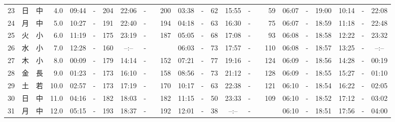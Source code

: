\documentclass[12pt,a4j]{jsarticle}
\begin{document}
\begin{table}[htbp]
\begin{center}
{\begin{tabular}{|rc|cr|ccrccr|ccrccr|ccc|ccc|}
23 & 日 & 中 &  4.0 &  09:44 &-& 204 &  22:06 &-& 200 &  03:38 &-&  62 &  15:55 &-&  59 & 06:07 & -& 19:00 & 10:14 & -& 22:08 \\
24 & 月 & 中 &  5.0 &  10:27 &-& 191 &  22:40 &-& 194 &  04:18 &-&  63 &  16:30 &-&  75 & 06:07 & -& 18:59 & 11:18 & -& 22:48 \\
25 & 火 & 小 &  6.0 &  11:19 &-& 175 &  23:19 &-& 187 &  05:05 &-&  68 &  17:08 &-&  93 & 06:08 & -& 18:58 & 12:22 & -& 23:32 \\
26 & 水 & 小 &  7.0 &  12:28 &-& 160 &  --:-- &-&~~~~~ &  06:03 &-&  73 &  17:57 &-& 110 & 06:08 & -& 18:57 & 13:25 & -& --:-- \\
27 & 木 & 小 &  8.0 &  00:09 &-& 179 &  14:14 &-& 152 &  07:21 &-&  77 &  19:16 &-& 124 & 06:09 & -& 18:56 & 14:28 & -& 00:19 \\
28 & 金 & 長 &  9.0 &  01:23 &-& 173 &  16:10 &-& 158 &  08:56 &-&  73 &  21:12 &-& 128 & 06:09 & -& 18:55 & 15:27 & -& 01:10 \\
29 & 土 & 若 & 10.0 &  02:57 &-& 173 &  17:19 &-& 170 &  10:17 &-&  63 &  22:38 &-& 121 & 06:10 & -& 18:54 & 16:22 & -& 02:05 \\
30 & 日 & 中 & 11.0 &  04:16 &-& 182 &  18:03 &-& 182 &  11:15 &-&  50 &  23:33 &-& 109 & 06:10 & -& 18:52 & 17:12 & -& 03:02 \\
31 & 月 & 中 & 12.0 &  05:15 &-& 193 &  18:37 &-& 192 &  12:01 &-&  38 &  --:-- &-&~~~~~ & 06:10 & -& 18:51 & 17:56 & -& 04:00 \\
   \hline
   \end{tabular}}
   \end{center}
\end{table}
\newpage
\end{document}
